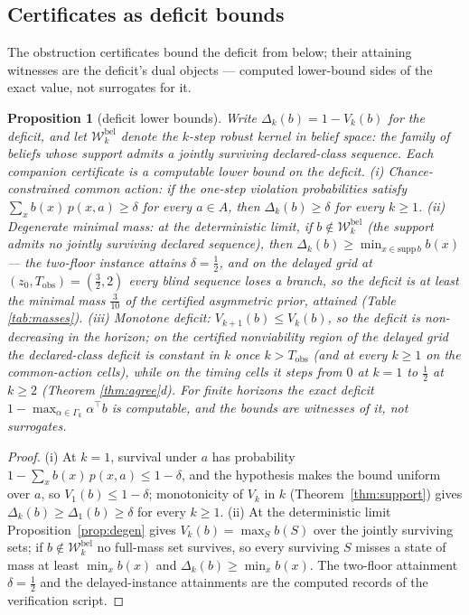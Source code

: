 \documentclass[10pt,twocolumn]{article}
\theoremstyle{plain}
\newtheorem{proposition}[theorem]{Proposition}
\theoremstyle{definition}
\theoremstyle{remark}
\begin{document}
\subsection{Certificates as deficit bounds}\label{deficit}

The obstruction certificates bound the deficit from below; their attaining
witnesses are the deficit's dual objects --- computed lower-bound sides of
the exact value, not surrogates for it.

\begin{proposition}[deficit lower bounds]\label{prop:deficit}
Write \(\Delta_{k}(b) = 1 - V_{k}(b)\) for the deficit, and let
\(\mathcal{W}^{\mathrm{bel}}_{k}\)
denote the \(k\)-step robust kernel in belief space: the family of beliefs
whose support admits a jointly surviving declared-class sequence. Each
companion certificate is a computable lower bound on the deficit.
(i) \emph{Chance-constrained common action:} if the one-step violation
probabilities satisfy \(\sum_{x} b(x)\, p(x, a) \ge \delta\) for every
\(a \in A\), then \(\Delta_{k}(b) \ge \delta\) for every \(k \ge 1\).
(ii) \emph{Degenerate minimal mass:} at the deterministic limit, if
\(b \notin \mathcal{W}^{\mathrm{bel}}_{k}\) (the support admits no jointly surviving declared
sequence), then \(\Delta_{k}(b) \ge \min_{x \in \mathrm{supp}\, b} b(x)\)
--- the two-floor instance attains \(\delta = \tfrac{1}{2}\), and on the
delayed grid at \((z_{0}, T_{\mathrm{obs}}) = (\tfrac{3}{2}, 2)\) every
blind sequence loses a branch, so the deficit is at least the minimal
mass \(\tfrac{3}{10}\) of the certified asymmetric prior, attained
(Table \ref{tab:masses}).
(iii) \emph{Monotone deficit:} \(V_{k+1}(b) \le V_{k}(b)\), so the
deficit is non-decreasing in the horizon; on the certified nonviability
region of the delayed grid the declared-class deficit is constant in
\(k\) once \(k > T_{\mathrm{obs}}\) (and at every \(k \ge 1\) on
the common-action cells), while on the timing cells it steps from
\(0\) at \(k = 1\) to \(\tfrac{1}{2}\) at \(k \ge 2\) (Theorem
\ref{thm:agree}d).
For finite horizons the exact deficit
\(1 - \max_{\alpha \in \Gamma_{k}} \alpha^{\top} b\) is computable, and
the bounds are witnesses of it, not surrogates.
\end{proposition}

\begin{proof}
(i) At \(k = 1\), survival under \(a\) has probability
\(1 - \sum_{x} b(x)\, p(x, a) \le 1 - \delta\), and the hypothesis
makes the bound uniform over \(a\), so \(V_{1}(b) \le 1 - \delta\);
monotonicity of \(V_{k}\) in \(k\) (Theorem~\ref{thm:support}) gives
\(\Delta_{k}(b) \ge \Delta_{1}(b) \ge \delta\) for every
\(k \ge 1\). (ii) At the deterministic limit
Proposition~\ref{prop:degen} gives \(V_{k}(b) = \max_{S} b(S)\) over
the jointly surviving sets; if
\(b \notin \mathcal{W}^{\mathrm{bel}}_{k}\) no full-mass set
survives, so every surviving \(S\) misses a state of mass at least
\(\min_{x} b(x)\) and \(\Delta_{k}(b) \ge \min_{x} b(x)\). The
two-floor attainment \(\delta = \tfrac12\) and the delayed-instance
attainments are the computed records of the verification script.
\end{proof}
\end{document}
